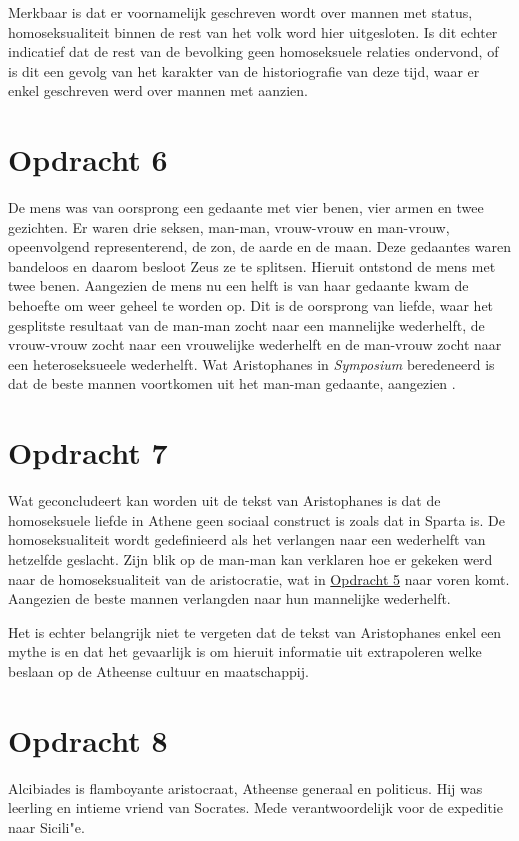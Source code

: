 \documentclass[10pt]{amsart}
\begin{document}
Merkbaar is dat er voornamelijk geschreven wordt over mannen met status, homoseksualiteit binnen de rest van het volk
word hier uitgesloten. Is dit echter indicatief dat de rest van de bevolking geen homoseksuele relaties ondervond, of
is dit een gevolg van het karakter van de historiografie van deze tijd, waar er enkel geschreven werd over mannen met
aanzien.

\section*{Opdracht 6}\label{opdracht6}
De mens was van oorsprong een gedaante met vier benen, vier armen en twee gezichten. Er waren drie seksen, man-man, vrouw-vrouw en man-vrouw, opeenvolgend representerend, de zon, de aarde en de maan.
Deze gedaantes waren bandeloos en daarom besloot Zeus ze te splitsen. Hieruit ontstond de mens met twee benen. Aangezien de mens nu een helft is van haar gedaante kwam de behoefte om weer geheel te worden op.
Dit is de oorsprong van liefde, waar het gesplitste resultaat van de man-man zocht naar een mannelijke wederhelft, de vrouw-vrouw zocht naar een vrouwelijke wederhelft en de man-vrouw zocht naar een heteroseksueele wederhelft. \autocite{platoSymposium189d-193a}
Wat Aristophanes in \textit{Symposium} beredeneerd is dat de beste mannen voortkomen uit het man-man gedaante, aangezien \autocite{platoSymposium189d-193a}.

\section*{Opdracht 7}
Wat geconcludeert kan worden uit de tekst van Aristophanes is dat de homoseksuele liefde in Athene geen sociaal construct is zoals dat in Sparta is. De homoseksualiteit wordt gedefinieerd als het verlangen naar een wederhelft van hetzelfde geslacht.
Zijn blik op de man-man kan verklaren hoe er gekeken werd naar de homoseksualiteit van de aristocratie, wat in \hyperref[opdracht5]{Opdracht 5} naar voren komt. Aangezien de beste mannen verlangden naar hun mannelijke wederhelft.

Het is echter belangrijk niet te vergeten dat de tekst van Aristophanes enkel een mythe is en dat het gevaarlijk is om
hieruit informatie uit extrapoleren welke beslaan op de Atheense cultuur en
maatschappij.\autocite{chatgptResponseHoeverreDenk2023}

\section*{Opdracht 8}
Alcibiades is flamboyante aristocraat, Atheense generaal en politicus. Hij was leerling en intieme vriend van Socrates. Mede verantwoordelijk voor de expeditie naar Sicili"e.
\end{document}
